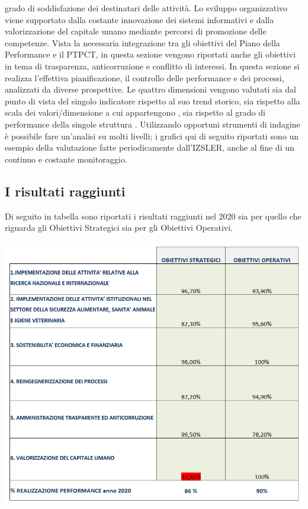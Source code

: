 \documentclass[
  12pt,
]{article}
\begin{document}
grado di soddisfazione dei destinatari delle attività. Lo sviluppo
organizzativo viene supportato dalla costante innovazione dei sistemi
informativi e dalla valorizzazione del capitale umano mediante percorsi
di promozione delle competenze. Vista la necessaria integrazione tra gli
obiettivi del Piano della Performance e il PTPCT, in questa sezione
vengono riportati anche gli obiettivi in tema di trasparenza,
anticorruzione e conflitto di interessi. In questa sezione si realizza
l'effettiva pianificazione, il controllo delle performance e dei
processi, analizzati da diverse prospettive. Le quattro dimensioni
vengono valutati sia dal punto di vista del singolo indicatore rispetto
al suo trend storico, sia rispetto alla scala dei valori/dimensione a
cui appartengono , sia rispetto al grado di performance della singole
struttura . Utilizzando opportuni strumenti di indagine è possibile fare
un'analisi su molti livelli; i grafici qui di seguito riportati sono un
esempio della valutazione fatte periodicamente dall'IZSLER, anche al
fine di un continuo e costante monitoraggio.

\hypertarget{i-risultati-raggiunti}{%
\subsection{I risultati raggiunti}\label{i-risultati-raggiunti}}

Di seguito in tabella sono riportati i risultati raggiunti nel 2020 sia
per quello che riguarda gli Obiettivi Strategici sia per gli Obiettivi
Operativi.

\begin{center}\includegraphics[width=0.9\linewidth]{figure/f8} \end{center}
\end{document}
